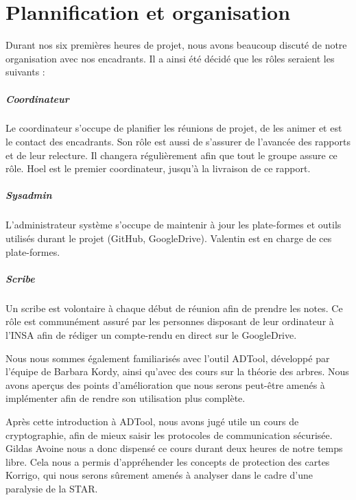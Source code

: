 \chapter{Plannification et organisation}

	Durant nos six premières heures de projet, nous avons beaucoup discuté de notre organisation avec nos encadrants. Il a ainsi été décidé que les rôles seraient les suivants :
	\paragraph{Coordinateur} Le coordinateur s'occupe de planifier les réunions de projet, de les animer et est le contact des encadrants. Son rôle est aussi de s'assurer de l'avancée des rapports et de leur relecture. Il changera régulièrement afin que tout le groupe assure ce rôle. Hoel est le premier coordinateur, jusqu'à la livraison de ce rapport.
	\paragraph{Sysadmin} L'administrateur système s'occupe de maintenir à jour les plate-formes et outils utilisés durant le projet (GitHub, GoogleDrive). Valentin est en charge de ces plate-formes.
	\paragraph{Scribe} Un scribe est volontaire à chaque début de réunion afin de prendre les notes. Ce rôle est communément assuré par les personnes disposant de leur ordinateur à l'INSA afin de rédiger un compte-rendu en direct sur le GoogleDrive.

	Nous nous sommes également familiarisés avec l'outil ADTool, développé par l'équipe de Barbara Kordy, ainsi qu'avec des cours sur la théorie des arbres. Nous avons aperçus des points d'amélioration que nous serons peut-être amenés à implémenter afin de rendre son utilisation plus complète.
	
	Après cette introduction à ADTool, nous avons jugé utile un cours de cryptographie, afin de mieux saisir les protocoles de communication sécurisée. Gildas Avoine nous a donc dispensé ce cours durant deux heures de notre temps libre. Cela nous a permis d'appréhender les concepts de protection des cartes Korrigo, qui nous serons sûrement amenés à analyser dans le cadre d'une paralysie de la STAR.